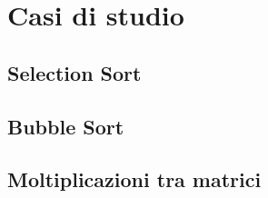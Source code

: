 \section{Casi di studio}\label{sec:CaseStudies}

\subsection{Selection Sort}

\subsection{Bubble Sort}

\subsection{Moltiplicazioni tra matrici}
